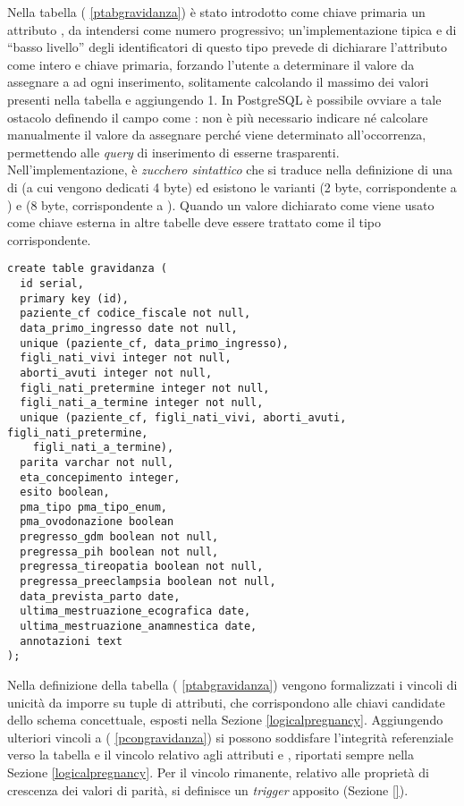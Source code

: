Nella tabella  (\lstlistingname{} \ref{ptabgravidanza}) è stato introdotto come chiave primaria un attributo , da intendersi come numero progressivo; un'implementazione tipica e di \enquote{basso livello} degli identificatori di questo tipo prevede di dichiarare l'attributo come intero e chiave primaria, forzando l'utente a determinare il valore da assegnare a  ad ogni inserimento, solitamente calcolando il massimo dei valori  presenti nella tabella e aggiungendo 1.
In PostgreSQL \cite{Pos25} è possibile ovviare a tale ostacolo definendo il campo  come : non è più necessario indicare né calcolare manualmente il valore  da assegnare perché viene determinato all'occorrenza, permettendo alle \emph{query} di inserimento di esserne trasparenti.
Nell'implementazione,  è \emph{zucchero sintattico} che si traduce nella definizione di una  di  (a cui vengono dedicati 4 byte) ed esistono le varianti  (2 byte, corrispondente a ) e  (8 byte, corrispondente a ).
Quando un valore dichiarato come  viene usato come chiave esterna in altre tabelle deve essere trattato come il tipo  corrispondente.

\begin{lstlisting}[float,caption={Definizione della tabella \tab{gravidanza}.},label=ptabgravidanza]
create table gravidanza (
  id serial,
  primary key (id),
  paziente_cf codice_fiscale not null,
  data_primo_ingresso date not null,
  unique (paziente_cf, data_primo_ingresso),
  figli_nati_vivi integer not null,
  aborti_avuti integer not null,
  figli_nati_pretermine integer not null,
  figli_nati_a_termine integer not null,
  unique (paziente_cf, figli_nati_vivi, aborti_avuti, figli_nati_pretermine,
    figli_nati_a_termine),
  parita varchar not null,
  eta_concepimento integer,
  esito boolean,
  pma_tipo pma_tipo_enum,
  pma_ovodonazione boolean
  pregresso_gdm boolean not null,
  pregressa_pih boolean not null,
  pregressa_tireopatia boolean not null,
  pregressa_preeclampsia boolean not null,
  data_prevista_parto date,
  ultima_mestruazione_ecografica date,
  ultima_mestruazione_anamnestica date,
  annotazioni text
);
\end{lstlisting}

Nella definizione della tabella  (\lstlistingname{} \ref{ptabgravidanza}) vengono formalizzati i vincoli di unicità da imporre su tuple di attributi, che corrispondono alle chiavi candidate dello schema concettuale, esposti nella Sezione \ref{logicalpregnancy}.
Aggiungendo ulteriori vincoli a  (\lstlistingname{} \ref{pcongravidanza}) si possono soddisfare l'integrità referenziale verso la tabella  e il vincolo relativo agli attributi  e , riportati sempre nella Sezione \ref{logicalpregnancy}.
Per il vincolo rimanente, relativo alle proprietà di crescenza dei valori di parità, si definisce un \emph{trigger} apposito (Sezione \ref{}).

